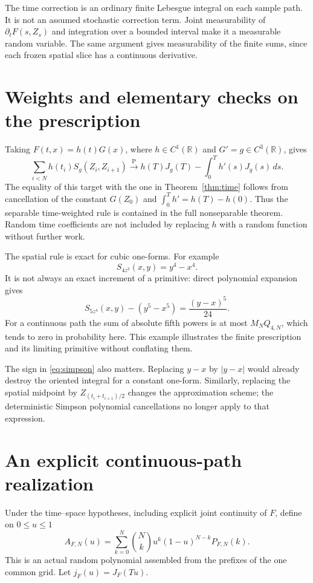 \documentclass[11pt]{article}
\theoremstyle{remark}\newtheorem{remark}[theorem]{Remark}
\newcommand{\R}{\mathbb R}\newcommand{\Pconv}{\xrightarrow{\mathrm P}}
\begin{document}
The time correction is an ordinary finite Lebesgue integral on
each sample path. It is not an assumed stochastic correction
term. Joint measurability of $\partial_tF(s,Z_s)$ and integration
over a bounded interval make it a measurable random variable.
The same argument gives measurability of the finite sums, since
each frozen spatial slice has a continuous derivative.

\section{Weights and elementary checks on the prescription}
Taking $F(t,x)=h(t)G(x)$, where $h\in C^1(\R)$ and
$G'=g\in C^3(\R)$, gives
\begin{equation}\label{eq:weighted}
 \sum_{i<N}h(t_i)S_g(Z_i,Z_{i+1})\Pconv
 h(T)J_g(T)-\int_0^T h'(s)J_g(s)\,ds.
\end{equation}
The equality of this target with the one in
Theorem~\ref{thm:time} follows from cancellation of the constant
$G(Z_0)$ and $\int_0^T h'=h(T)-h(0)$.
Thus the separable time-weighted rule is contained in the full
nonseparable theorem. Random time coefficients are not included
by replacing $h$ with a random function without further work.

The spatial rule is exact for cubic one-forms. For example
\[
 S_{4z^3}(x,y)=y^4-x^4.
\]
It is not always an exact increment of a primitive: direct
polynomial expansion gives
\begin{equation}\label{eq:quintic}
 S_{5z^4}(x,y)-(y^5-x^5)=\frac{(y-x)^5}{24}.
\end{equation}
For a continuous path the sum of absolute fifth powers is at
most $M_NQ_{4,N}$, which tends to zero in probability here.
This example illustrates the finite prescription and its limiting
primitive without conflating them.

The sign in \eqref{eq:simpson} also matters. Replacing $y-x$
by $|y-x|$ would already destroy the oriented integral for a
constant one-form. Similarly, replacing the spatial midpoint
by $Z_{(t_i+t_{i+1})/2}$ changes the approximation scheme;
the deterministic Simpson polynomial cancellations no longer
apply to that expression.

\section{An explicit continuous-path realization}\label{sec:bernstein}
Under the time--space hypotheses, including explicit joint
continuity of $F$, define on $0\leq u\leq1$
\begin{equation}\label{eq:bernstein}
 A_{F,N}(u)=\sum_{k=0}^N
 \binom Nk u^k(1-u)^{N-k}P_{F,N}(k).
\end{equation}
This is an actual random polynomial assembled from the prefixes
of the one common grid. Let $j_F(u)=J_F(Tu)$.
\end{document}
